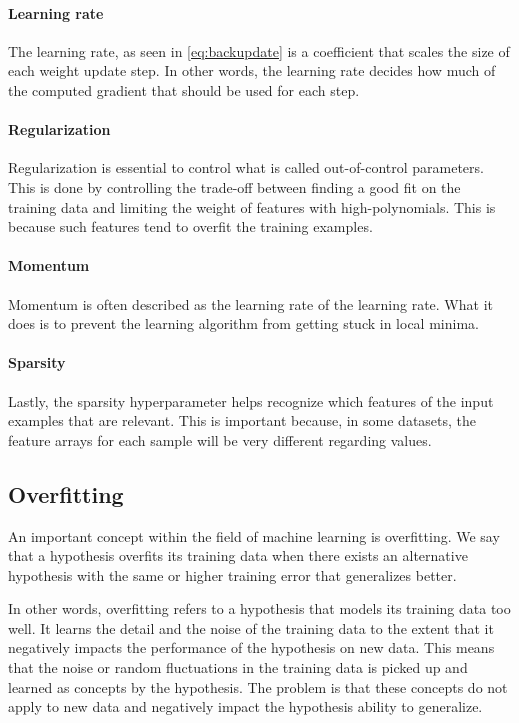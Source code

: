\paragraph{Learning rate}
The learning rate, as seen in \autoref{eq:backupdate} is a coefficient that scales the size of each weight update step. In other words, the learning rate decides how much of the computed gradient that should be used for each step. 

\paragraph{Regularization}
Regularization is essential to control what is called out-of-control parameters. This is done by controlling the trade-off between finding a good fit on the training data and limiting the weight of features with high-polynomials. This is because such features tend to overfit the training examples.

\paragraph{Momentum}
Momentum is often described as the learning rate of the learning rate. What it does is to prevent the learning algorithm from getting stuck in local minima.

\paragraph{Sparsity}
Lastly, the sparsity hyperparameter helps recognize which features of the input examples that are relevant. This is important because, in some datasets, the feature arrays for each sample will be very different regarding values.

\subsection{Overfitting}
An important concept within the field of machine learning is overfitting. We say that a hypothesis overfits its training data when there exists an alternative hypothesis with the same or higher training error that generalizes better.

In other words, overfitting refers to a hypothesis that models its training data too well. It learns the detail and the noise of the training data to the extent that it negatively impacts the performance of the hypothesis on new data. This means that the noise or random fluctuations in the training data is picked up and learned as concepts by the hypothesis. The problem is that these concepts do not apply to new data and negatively impact the hypothesis ability to generalize.

